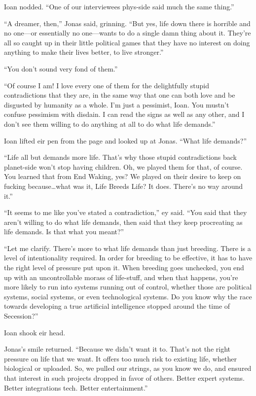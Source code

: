 Ioan nodded. ``One of our interviewees phys-side said much the same thing.''

``A dreamer, then,'' Jonas said, grinning. ``But yes, life down there is horrible and no one---or essentially no one---wants to do a single damn thing about it. They're all so caught up in their little political games that they have no interest on doing anything to make their lives better, to live stronger.''

``You don't sound very fond of them.''

``Of course I am! I love every one of them for the delightfully stupid contradictions that they are, in the same way that one can both love and be disgusted by humanity as a whole. I'm just a pessimist, Ioan. You mustn't confuse pessimism with disdain. I can read the signs as well as any other, and I don't see them willing to do anything at all to do what life demands.''

Ioan lifted eir pen from the page and looked up at Jonas. ``What life demands?''

``Life all but demands more life. That's why those stupid contradictions back planet-side won't stop having children. Oh, we played them for that, of course. You learned that from End Waking, yes? We played on their desire to keep on fucking because\ldots what was it, Life Breeds Life? It does. There's no way around it.''

``It seems to me like you've stated a contradiction,'' ey said. ``You said that they aren't willing to do what life demands, then said that they keep procreating as life demands. Is that what you meant?''

``Let me clarify. There's more to what life demands than just breeding. There is a level of intentionality required. In order for breeding to be effective, it has to have the right level of pressure put upon it. When breeding goes unchecked, you end up with an uncontrollable morass of life-stuff, and when that happens, you're more likely to run into systems running out of control, whether those are political systems, social systems, or even technological systems. Do you know why the race towards developing a true artificial intelligence stopped around the time of Secession?''

Ioan shook eir head.

Jonas's smile returned. ``Because we didn't want it to. That's not the right pressure on life that we want. It offers too much risk to existing life, whether biological or uploaded. So, we pulled our strings, as you know we do, and ensured that interest in such projects dropped in favor of others. Better expert systems. Better integrations tech. Better entertainment.''


